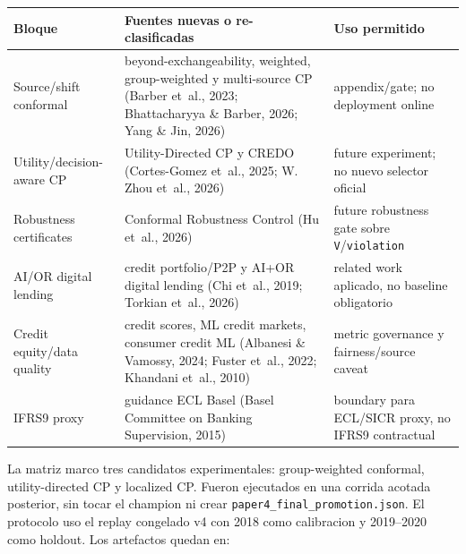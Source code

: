 \documentclass[
  spanish,
  11pt,
  letterpaper,
]{scrbook}
\newcounter{none} %
\theoremstyle{plain}
\theoremstyle{remark}
\begin{document}
{\def\LTcaptype{none} %
\begin{longtable}[]{@{}
  >{\raggedright\arraybackslash}p{}
  >{\raggedright\arraybackslash}p{}
  >{\raggedright\arraybackslash}p{}@{}}
\toprule\noalign{}
\begin{minipage}[b]{\linewidth}\raggedright
Bloque
\end{minipage} & \begin{minipage}[b]{\linewidth}\raggedright
Fuentes nuevas o re-clasificadas
\end{minipage} & \begin{minipage}[b]{\linewidth}\raggedright
Uso permitido
\end{minipage} \\
\midrule\noalign{}
\endhead
\bottomrule\noalign{}
\endlastfoot
Source/shift conformal & beyond-exchangeability, weighted,
group-weighted y multi-source CP (Barber et~al., 2023; Bhattacharyya \&
Barber, 2026; Yang \& Jin, 2026) & appendix/gate; no deployment
online \\
Utility/decision-aware CP & Utility-Directed CP y CREDO (Cortes-Gomez
et~al., 2025; W. Zhou et~al., 2026) & future experiment; no nuevo
selector oficial \\
Robustness certificates & Conformal Robustness Control (Hu et~al., 2026)
& future robustness gate sobre \texttt{V}/\texttt{violation} \\
AI/OR digital lending & credit portfolio/P2P y AI+OR digital lending
(Chi et~al., 2019; Torkian et~al., 2026) & related work aplicado, no
baseline obligatorio \\
Credit equity/data quality & credit scores, ML credit markets, consumer
credit ML (Albanesi \& Vamossy, 2024; Fuster et~al., 2022; Khandani
et~al., 2010) & metric governance y fairness/source caveat \\
IFRS9 proxy & guidance ECL Basel (Basel Committee on Banking
Supervision, 2015) & boundary para ECL/SICR proxy, no IFRS9
contractual \\
\end{longtable}
}

La matriz marco tres candidatos experimentales: group-weighted
conformal, utility-directed CP y localized CP. Fueron ejecutados en una
corrida acotada posterior, sin tocar el champion ni crear
\texttt{paper4\_final\_promotion.json}. El protocolo uso el replay
congelado v4 con 2018 como calibracion y 2019--2020 como holdout. Los
artefactos quedan en:
\end{document}

